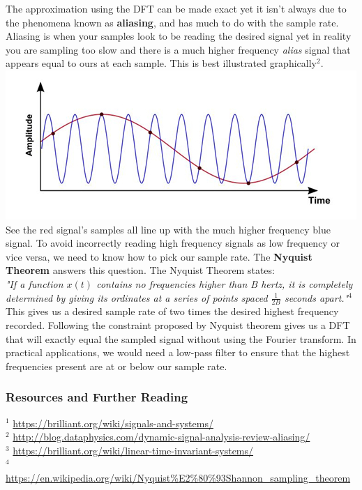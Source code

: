 \documentclass[12pt]{article}
\begin{document}
The approximation using the DFT can be made exact yet it isn't always due to the phenomena known as \textbf{aliasing}, and has much to do with the sample rate. Aliasing is when your samples look to be reading the desired signal yet in reality you are sampling too slow and there is a much higher frequency \textit{alias} signal that appears equal to ours at each sample. This is best illustrated graphically$^2$.\\ 
\includegraphics[scale=0.85]{aliasingB}
See the red signal's samples all line up with the much higher frequency blue signal. To avoid incorrectly reading high frequency signals as low frequency or vice versa, we need to know how to pick our sample rate. The \textbf{Nyquist Theorem} answers this question. The Nyquist Theorem states: \\\textit{"If a function $x(t)$ contains no frequencies higher than B hertz, it is completely determined by giving its ordinates at a series of points spaced $\frac{1}{2B}$ seconds apart."}$^4$\\
This gives us a desired sample rate of two times the desired highest frequency recorded. Following the constraint proposed by Nyquist theorem gives us a DFT that will exactly equal the sampled signal without using the Fourier transform. In  practical applications, we would need a low-pass filter to ensure that the highest frequencies present are at or below our sample rate.


\subsubsection*{Resources and Further Reading}
$^1$ \url{https://brilliant.org/wiki/signals-and-systems/} \\
$^2$ \url{http://blog.dataphysics.com/dynamic-signal-analysis-review-aliasing/} \\
$^3$ \url{https://brilliant.org/wiki/linear-time-invariant-systems/} \\
$^4$ \url{https://en.wikipedia.org/wiki/Nyquist%E2%80%93Shannon_sampling_theorem}
\end{document}
